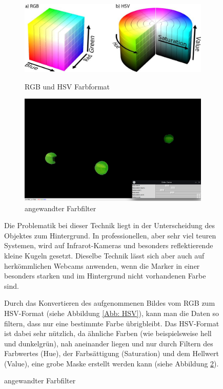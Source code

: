 \documentclass[12pt, ngerman]{article}
\begin{document}
\vspace{10pt}
\begin{figure}[H]
  \begin{figure}
    \includegraphics[angle=0,width=\linewidth]{rgb-hsv.png}
    \caption{RGB und HSV Farbformat}
    \label{Abb: HSV}
    \includegraphics[angle=0,width=\linewidth]{2d-normal-filter.jpg}
    \caption{angewandter Farbfilter}
    \label{Abb: Farbfilter}
  \end{figure}
  Die Problematik bei dieser Technik liegt in der Unterscheidung des Objektes zum Hintergrund. In professionellen, aber sehr viel teuren Systemen, wird auf Infrarot-Kameras und besonders reflektierende kleine Kugeln gesetzt. Dieselbe Technik lässt sich aber auch auf herkömmlichen Webcams anwenden, wenn die Marker in einer besonders starken und im Hintergrund nicht vorhandenen Farbe sind. 

  Durch das Konvertieren des aufgenommenen Bildes vom RGB zum HSV-Format (siehe Abbildung \ref{Abb: HSV}), kann man die Daten so filtern, dass nur eine bestimmte Farbe übrigbleibt. Das HSV-Format ist dabei sehr nützlich, da ähnliche Farben (wie beispielsweise hell und dunkelgrün), nah aneinander liegen und nur durch Filtern des Farbwertes (Hue), der Farbsättigung (Saturation) und dem Hellwert (Value), eine grobe Maske erstellt werden kann (siehe Abbildung \ref{Abb: Farbfilter}). 
\end{figure}
\end{document}
